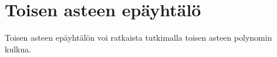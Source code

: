 \section{Toisen asteen epäyhtälö}




Toisen asteen epäyhtälön voi ratkaista tutkimalla toisen asteen polynomin kulkua.

